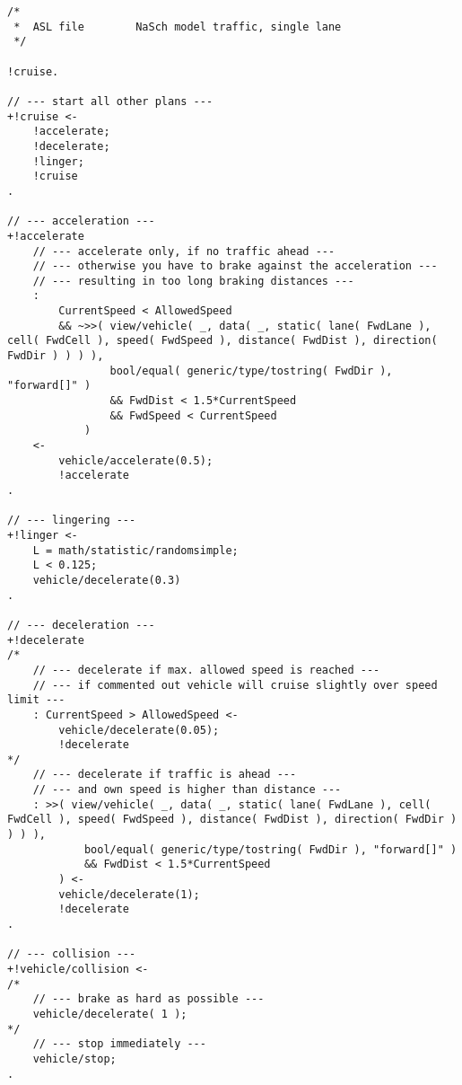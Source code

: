 \begin{lstlisting}[style=asl, 
                   keywords={+!cruise,+!accelerate,+!linger,+!decelerate,+!vehicle/collision}, 
                   keywords={[2]}, 
                   keywords={[3]}, 
                   caption={Agentenscript: NaSch-Modell, einspurig},
                   label={lst:nasch}]      
/*
 *  ASL file        NaSch model traffic, single lane
 */

!cruise.

// --- start all other plans ---
+!cruise <-
    !accelerate;
    !decelerate;
    !linger;
    !cruise
.

// --- acceleration ---
+!accelerate
    // --- accelerate only, if no traffic ahead ---
    // --- otherwise you have to brake against the acceleration ---
    // --- resulting in too long braking distances ---
    : 
        CurrentSpeed < AllowedSpeed
        && ~>>( view/vehicle( _, data( _, static( lane( FwdLane ), cell( FwdCell ), speed( FwdSpeed ), distance( FwdDist ), direction( FwdDir ) ) ) ),
                bool/equal( generic/type/tostring( FwdDir ), "forward[]" )
                && FwdDist < 1.5*CurrentSpeed
                && FwdSpeed < CurrentSpeed
            )
    <-
        vehicle/accelerate(0.5);
        !accelerate
.

// --- lingering ---
+!linger <-
    L = math/statistic/randomsimple;
    L < 0.125;
    vehicle/decelerate(0.3)
.

// --- deceleration ---
+!decelerate 
/*
    // --- decelerate if max. allowed speed is reached ---
    // --- if commented out vehicle will cruise slightly over speed limit ---
    : CurrentSpeed > AllowedSpeed <-
        vehicle/decelerate(0.05);
        !decelerate
*/
    // --- decelerate if traffic is ahead ---
    // --- and own speed is higher than distance ---
    : >>( view/vehicle( _, data( _, static( lane( FwdLane ), cell( FwdCell ), speed( FwdSpeed ), distance( FwdDist ), direction( FwdDir ) ) ) ), 
            bool/equal( generic/type/tostring( FwdDir ), "forward[]" ) 
            && FwdDist < 1.5*CurrentSpeed
        ) <-
        vehicle/decelerate(1);
        !decelerate
.

// --- collision ---
+!vehicle/collision <-
/*
    // --- brake as hard as possible ---
    vehicle/decelerate( 1 );
*/
    // --- stop immediately ---
    vehicle/stop;
.\end{lstlisting}


\newpage



